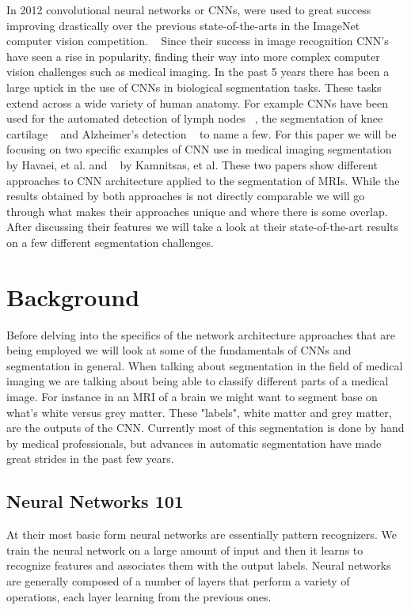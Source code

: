 \documentclass{sig-alternate}
\begin{document}
In 2012 convolutional neural networks or CNNs, were used to great success improving drastically over the previous state-of-the-arts in the ImageNet computer vision competition. ~\cite{NIPS:2012} Since their success in image recognition CNN's have seen a rise in popularity, finding their way into more complex computer vision challenges such as medical imaging. In the past 5 years there has been a large uptick in the use of CNNs in biological segmentation tasks. These tasks extend across a wide variety of human anatomy. For example CNNs have been used for the automated detection of lymph nodes ~\cite{Roth:2014}, the segmentation of knee cartilage ~\cite{Prasoon:2013} and Alzheimer's detection ~\cite{Payan:2015} to name a few. For this paper we will be focusing on two specific examples of CNN use in medical imaging segmentation ~\cite{Havaei:2017} by Havaei, et al. and ~\cite{Kamnitsas:2017} by Kamnitsas, et al. These two papers show different approaches to CNN architecture applied to the segmentation of MRIs. While the results obtained by both approaches is not directly comparable we will go through what makes their approaches unique and where there is some overlap. After discussing their features we will take a look at their state-of-the-art results on a few different segmentation challenges.

\section{Background}
\label{sec:background}

Before delving into the specifics of the network architecture approaches that are being employed we will look at some of the fundamentals of CNNs and segmentation in general. When talking about segmentation in the field of medical imaging we are talking about being able to classify different parts of a medical image. For instance in an MRI of a brain we might want to segment base on what's white versus grey matter. These "labels", white matter and grey matter, are the outputs of the CNN. Currently most of this segmentation is done by hand by medical professionals, but advances in automatic segmentation have made great strides in the past few years. 

\subsection{Neural Networks 101}
\label{sec:neuralNetworks101}

At their most basic form neural networks are essentially pattern recognizers. We train the neural network on a large amount of input and then it learns to recognize features and associates them with the output labels. Neural networks are generally composed of a number of layers that perform a variety of operations, each layer learning from the previous ones.
\end{document}
